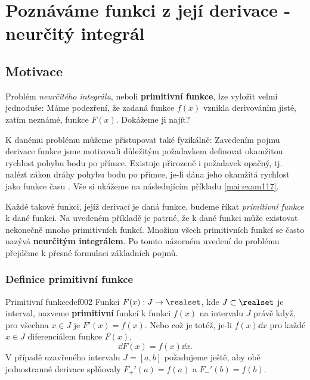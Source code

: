\setchaptertoc
\chapter{Poznáváme funkci z její derivace - neurčitý integrál}\label{mai:IchapVII}
  \section{Motivace}
    Problém \emph{neurčitého integrálu}, neboli \textbf{primitivní funkce}, lze vyložit velmi 
    jednoduše: Máme podezření, že zadaná funkce \(f(x)\) vznikla derivováním jisté, zatím neznámé, 
    funkce \(F(x)\). Dokážeme ji najít? 
  
    K danému problému můžeme přistupovat také fyzikálně: Zavedením pojmu derivace funkce jsme 
    motivovali důležitým požadavkem definovat okamžitou rychlost pohybu bodu po přímce. Existuje 
    přirozeně i požadavek opačný, tj. nalézt zákon dráhy pohybu bodu po přímce, je-li dána jeho 
    okamžitá rychlost jako funkce času \cite[s.~253]{Brabec1989}. Vše si ukážeme na následujícím 
    příkladu \eqref{mai:exam117}.      

    Každé takové funkci, jejíž derivací je daná funkce, budeme říkat \emph{primitivní funkce} k 
    dané funkci. Na uvedeném příkladě je patrné, že k dané funkci může existovat nekonečně mnoho 
    primitivních funkcí. Množinu všech primitivních funkcí se často nazývá \textbf{neurčitým 
    integrálem}. Po tomto názorném uvedení do problému přejděme k přesné formulaci základních pojmů.
    
    
    \subsection{Definice primitivní funkce}\label{mai:IchapVIIsecI}    
      \begin{mathdef}{Primitivní funkce}{def002}
        Funkci \(F(x): J\rightarrow \realset\), kde \(J\subset \realset\) je interval, nazveme
        \textbf{primitivní} funkcí k funkci \(f(x)\) na intervalu \(J\) právě když, pro všechna
        \(x\in J\) je \(F'(x) = f(x)\). Nebo což je totéž, je-li \(f(x)\dd{x}\) pro každé \(x\in J\)
        diferenciálem funkce \(F(x)\),
        \begin{equation*}
          \dd{F}(x) = f(x)\dd{x}.
        \end{equation*}        
        V případě uzavřeného intervalu \(J=[a,b]\) požadujeme ještě, aby obě jednostranné derivace
        splňovaly \(F_+'(a)=f(a)\) a \(F_-'(b)=f(b)\). 
      \end{mathdef}

